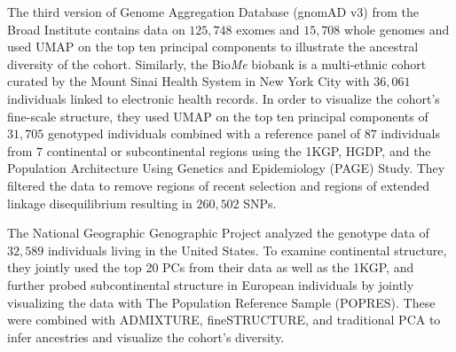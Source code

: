 \documentclass[12pt]{article}
\begin{document}
The third version of Genome Aggregation Database (gnomAD v3) from the Broad Institute contains data on $125,748$ exomes and $15,708$ whole genomes and used UMAP on the top ten principal components to illustrate the ancestral diversity of the cohort\cite{karczewski_mutational_2020}. Similarly, the Bio\textit{Me} biobank is a multi-ethnic cohort curated by the Mount Sinai Health System in New York City with $36,061$ individuals linked to electronic health records. In order to visualize the cohort's fine-scale structure, they used UMAP on the top ten principal components of $31,705$ genotyped individuals combined with a reference panel of $87$ individuals from $7$ continental or subcontinental regions using the 1KGP, HGDP, and the Population Architecture Using Genetics and Epidemiology (PAGE) Study\cite{matise2011next}. They filtered the data to remove regions of recent selection and regions of extended linkage disequilibrium resulting in $260,502$ SNPs.

The National Geographic Genographic Project analyzed the genotype data of $32,589$ individuals living in the United States\cite{dai_population_2020}. To examine continental structure, they jointly used the top 20 PCs from their data as well as the 1KGP, and further probed subcontinental structure in European individuals by jointly visualizing the data with The Population Reference Sample (POPRES)\cite{nelson2008population}. These were combined with ADMIXTURE, fineSTRUCTURE, and traditional PCA to infer ancestries and visualize the cohort's diversity.
\end{document}
